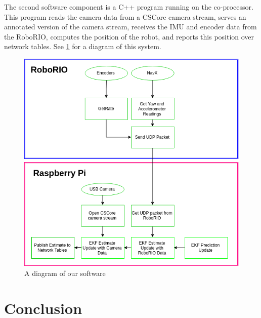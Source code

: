 \documentclass{article}
\begin{document}
    The second software component is a C++ program running on the co-processor. This program reads the camera data from a CSCore camera stream, serves an annotated version of the camera stream, receives the IMU and encoder data from the RoboRIO, computes the position of the robot, and reports this position over network tables. See \ref{fig:software_diagram} for a diagram of this system.

    \begin{figure}[H]
      \centering
      \includegraphics[width=1\linewidth]{./images/MQP_System_Chart.png}
      \caption{A diagram of our software}
      \label{fig:software_diagram}
    \end{figure}




\section{Conclusion} \label{section:conclusion}
\end{document}
